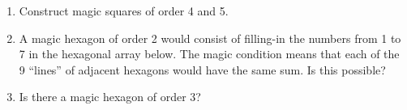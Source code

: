 \begin{enumerate}
\newpage

\item Construct magic squares of order 4 and 5.

\item A magic hexagon of order 2 would consist of filling-in
the numbers from 1 to 7 in the hexagonal array below.  The magic
condition means that each of the 9 ``lines'' of adjacent hexagons
would have the same sum.  Is this possible?

\begin{center}

\end{center}

\item Is there a magic hexagon of order 3?

\end{enumerate}




